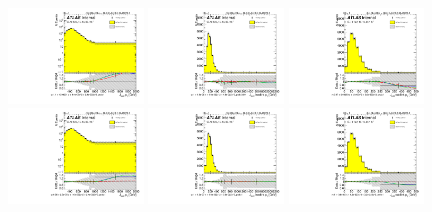 \begin{figure}[htbp!]
\begin{center}
\includegraphics[width=0.32\textwidth,angle=-90]{figures/boosted/Reweight/Fits/Moriond_bkg_3_NoTag_4Trk_lead_Incl_sublHCand_Pt_m_1.pdf}
\includegraphics[width=0.32\textwidth,angle=-90]{figures/boosted/Reweight/Fits/Moriond_bkg_3_NoTag_4Trk_lead_Incl_sublHCand_trk0_Pt.pdf}
\includegraphics[width=0.32\textwidth,angle=-90]{figures/boosted/Reweight/Fits/Moriond_bkg_3_NoTag_4Trk_lead_Incl_sublHCand_trk1_Pt.pdf} \\
\includegraphics[width=0.32\textwidth,angle=-90]{figures/boosted/Reweight/Fits/Moriond_bkg_9_NoTag_4Trk_lead_Incl_sublHCand_Pt_m_1.pdf}
\includegraphics[width=0.32\textwidth,angle=-90]{figures/boosted/Reweight/Fits/Moriond_bkg_9_NoTag_4Trk_lead_Incl_sublHCand_trk0_Pt.pdf}
\includegraphics[width=0.32\textwidth,angle=-90]{figures/boosted/Reweight/Fits/Moriond_bkg_9_NoTag_4Trk_lead_Incl_sublHCand_trk1_Pt.pdf} \\

\end{center}
\end{figure}
